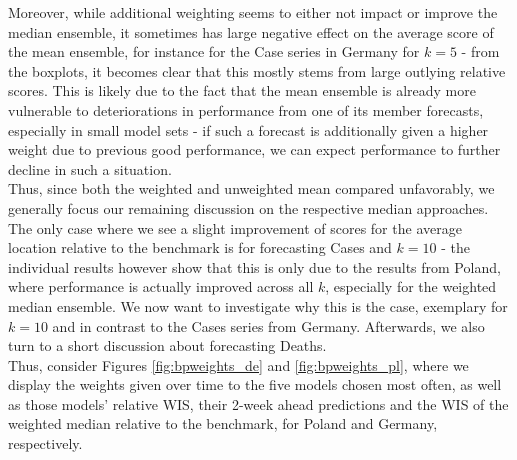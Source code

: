 Moreover, while additional weighting seems to either not impact or improve the median ensemble, it sometimes has large negative effect on the average score of the mean ensemble, for instance for the Case series in Germany for $k = 5$ - from the boxplots, it becomes clear that this mostly stems from large outlying relative scores. This is likely due to the fact that the mean ensemble is already more vulnerable to deteriorations in performance from one of its member forecasts, especially in small model sets - if such a forecast is additionally given a higher weight due to previous good performance, we can expect performance to further decline in such a situation.\\
Thus, since both the weighted and unweighted mean compared unfavorably, we generally focus our remaining discussion on the respective median approaches. \medskip\\
The only case where we see a slight improvement of scores for the average location relative to the benchmark is for forecasting Cases and $k = 10$ - the individual results however show that this is only due to the results from Poland, where performance is actually improved across all $k$, especially for the weighted median ensemble. We now want to investigate why this is the case, exemplary for $k = 10$ and in contrast to the Cases series from Germany. Afterwards, we also turn to a short discussion about forecasting Deaths.\\
Thus, consider Figures \ref{fig:bpweights_de} and \ref{fig:bpweights_pl}, where we display the weights given over time to the five models chosen most often, as well as those models' relative WIS, their 2-week ahead predictions and the WIS of the weighted median relative to the benchmark, for Poland and Germany, respectively.
